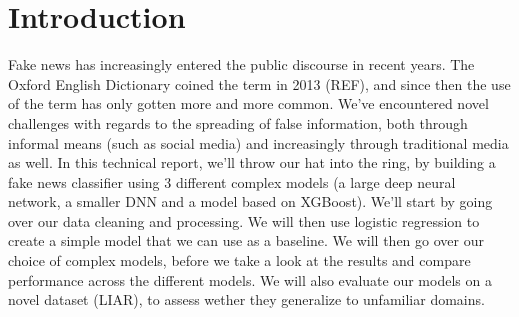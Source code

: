 \section{Introduction}
Fake news has increasingly entered the public discourse in recent years. The Oxford English Dictionary coined the term
in 2013 (REF), and since then the use of the term has only gotten more and more common. We've encountered
novel challenges with regards to the spreading of false information, both through informal means (such as social media)
and increasingly through traditional media as well. In this technical report, we'll throw our hat
into the ring, by building a fake news classifier using 3 different complex models (a large deep neural network, a
smaller DNN and a model based on XGBoost). We'll start by going over our
data cleaning and processing. We will then use logistic regression to create a simple model that we can use as a
baseline. We will then go over our choice of complex models, before we take a look at the results and compare
performance across the different models. We will also evaluate our models on a novel dataset (LIAR), to assess wether
they generalize to unfamiliar domains.
